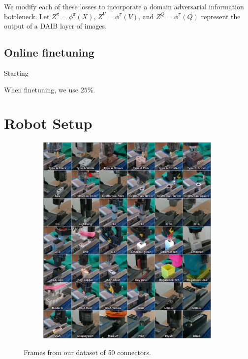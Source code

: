 \documentclass[letterpaper, 10 pt, conference, final]{ieeeconf}   %
\newcommand{\numconnectors}{50}
\def\methodabbrv {DAIB{}}
\begin{document}
We modify each of these losses to incorporate a domain adversarial information bottleneck.
Let $Z^\pi = \phi^\pi(X)$, $Z^V = \phi^\pi(V)$, and $Z^Q = \phi^\pi(Q)$ represent the output of a \methodabbrv{} layer of images.



\subsection{Online finetuning}

Starting 

When finetuning, we use $25\%$.


\section{Robot Setup}

\begin{figure}[t]
    \centering
    \begin{subfigure}[b]{0.99\linewidth}
        \center
        \includegraphics[width=0.99\textwidth]{imgs/connectors.pdf}
    \end{subfigure}

    \caption{Frames from our dataset of \numconnectors{} connectors.}
    \label{fig:connectortable}
    \vspace{-0.5cm}
\end{figure}
\end{document}
